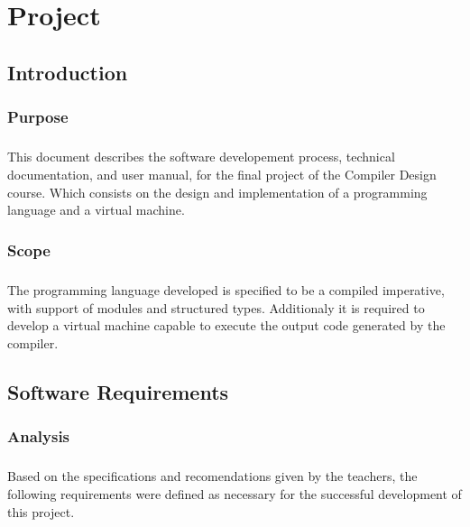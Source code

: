 
\chapter{Project}

\section{Introduction}
\subsection{Purpose}
\paragraph{} This document describes the software developement process, 
technical documentation, and user manual, for the final project of the Compiler
Design course. Which consists on the design and implementation of a programming
language and a virtual machine.

\subsection{Scope}
\paragraph{} The programming language developed is specified to be a compiled
imperative, with support of modules and structured types. Additionaly it is
required to develop a virtual machine capable to execute the output code
generated by the compiler.

\newpage

\section{Software Requirements}
\subsection{Analysis}
\paragraph{} Based on the specifications and recomendations given by the
teachers, the following requirements were defined as necessary for the
successful development of this project.

